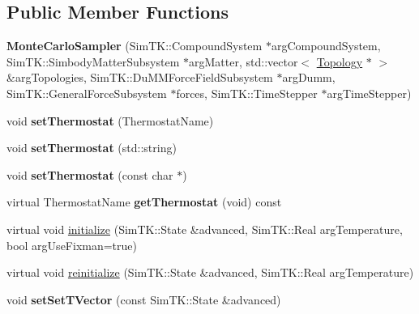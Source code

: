 \subsection*{Public Member Functions}
\begin{DoxyCompactItemize}
\item 
{\bfseries Monte\+Carlo\+Sampler} (Sim\+T\+K\+::\+Compound\+System $\ast$arg\+Compound\+System, Sim\+T\+K\+::\+Simbody\+Matter\+Subsystem $\ast$arg\+Matter, std\+::vector$<$ \hyperlink{classTopology}{Topology} $\ast$ $>$ \&arg\+Topologies, Sim\+T\+K\+::\+Du\+M\+M\+Force\+Field\+Subsystem $\ast$arg\+Dumm, Sim\+T\+K\+::\+General\+Force\+Subsystem $\ast$forces, Sim\+T\+K\+::\+Time\+Stepper $\ast$arg\+Time\+Stepper)\hypertarget{classMonteCarloSampler_a07b24155322212a06eaee8e945e349ee}{}\label{classMonteCarloSampler_a07b24155322212a06eaee8e945e349ee}

\item 
void {\bfseries set\+Thermostat} (Thermostat\+Name)\hypertarget{classMonteCarloSampler_a1ead7846108a3fc20f01c97442c39c17}{}\label{classMonteCarloSampler_a1ead7846108a3fc20f01c97442c39c17}

\item 
void {\bfseries set\+Thermostat} (std\+::string)\hypertarget{classMonteCarloSampler_aefbf81422671bbf30387e1d710f81147}{}\label{classMonteCarloSampler_aefbf81422671bbf30387e1d710f81147}

\item 
void {\bfseries set\+Thermostat} (const char $\ast$)\hypertarget{classMonteCarloSampler_a405e4793d80178a19cd46664ba3b2ad2}{}\label{classMonteCarloSampler_a405e4793d80178a19cd46664ba3b2ad2}

\item 
virtual Thermostat\+Name {\bfseries get\+Thermostat} (void) const \hypertarget{classMonteCarloSampler_a058662609fcf2d35bb4c1d68754c73e1}{}\label{classMonteCarloSampler_a058662609fcf2d35bb4c1d68754c73e1}

\item 
virtual void \hyperlink{classMonteCarloSampler_a1063f1111e793d942f35481a4d7346d7}{initialize} (Sim\+T\+K\+::\+State \&advanced, Sim\+T\+K\+::\+Real arg\+Temperature, bool arg\+Use\+Fixman=true)
\item 
virtual void \hyperlink{classMonteCarloSampler_a4e085e821dffa919cc385a2b052603cc}{reinitialize} (Sim\+T\+K\+::\+State \&advanced, Sim\+T\+K\+::\+Real arg\+Temperature)
\item 
void {\bfseries set\+Set\+T\+Vector} (const Sim\+T\+K\+::\+State \&advanced)\hypertarget{classMonteCarloSampler_a49ddb4d4f1d48b9fd3d6f9b1bc9762be}{}\label{classMonteCarloSampler_a49ddb4d4f1d48b9fd3d6f9b1bc9762be}


\end{DoxyCompactItemize}
